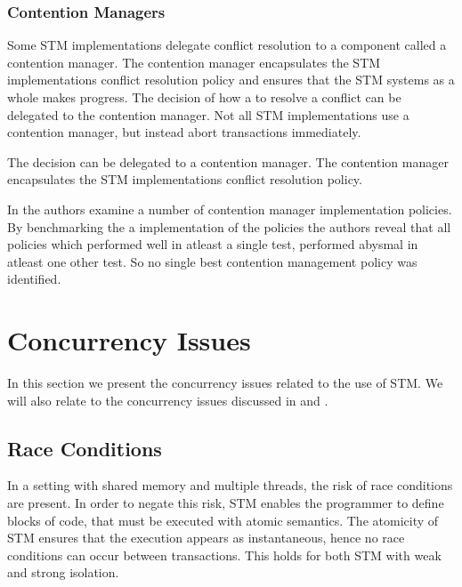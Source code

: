 \subsubsection{Contention Managers}
\label{subsub:con_managers}
Some \ac{STM} implementations delegate conflict resolution to a component called a contention manager\cite[p. 2085]{herlihy2011tm}. The contention manager encapsulates the \ac{STM} implementations conflict resolution policy\cite[p. 2085]{herlihy2011tm} and ensures that the \ac{STM} systems as a whole makes progress\cite[p. 1]{guerraoui2005toward}. The decision of how a to resolve a conflict can be delegated to the contention manager. Not all \ac{STM} implementations use a contention manager, but instead abort transactions immediately\cite[38]{riegel2013software}.

The decision can be delegated to a contention manager. The contention manager encapsulates the \ac{STM} implementations conflict resolution policy\cite[p. 2085]{herlihy2011tm}.

In \cite{scherer2004contention} the authors examine a number of contention manager implementation policies. By benchmarking the a implementation of the policies the authors reveal that all policies which performed well in atleast a single test, performed abysmal in atleast one other test. So no single best contention management policy was identified.


\section{Concurrency Issues}
In this section we present the concurrency issues related to the use of \ac{STM}. We will also relate to the concurrency issues discussed in  and .
\label{sec:stm_issues}

\subsection{Race Conditions}
In a setting with shared memory and multiple threads, the risk of race conditions are present. In order to negate this risk, \ac{STM} enables the programmer to define blocks of code, that must be executed with atomic semantics. The atomicity of \ac{STM} ensures that the execution appears as instantaneous, hence no race conditions can occur between transactions. This holds for both \ac{STM} with weak and strong isolation.


